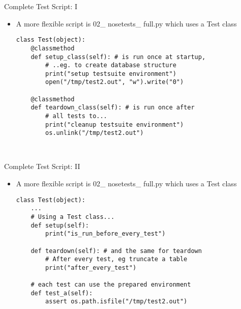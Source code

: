 \begin{frame}[fragile]{Complete Test Script: I}
\begin{itemize}
\item A more flexible script is 02\_ nosetests\_ full.py 
which uses a Test class
\begin{verbatim}
class Test(object):
    @classmethod
    def setup_class(self): # is run once at startup, 
        # ..eg. to create database structure
        print("setup testsuite environment")
        open("/tmp/test2.out", "w").write("0")

    @classmethod
    def teardown_class(self): # is run once after 
        # all tests to...
        print("cleanup testsuite environment")
        os.unlink("/tmp/test2.out")

 
\end{verbatim} 
\end{itemize}
\end{frame}

\begin{frame}[fragile]{Complete Test Script: II}
\begin{itemize}
\item A more flexible script is 02\_ nosetests\_ full.py 
which uses a Test class
\begin{verbatim}
class Test(object):
    ...
    # Using a Test class...
    def setup(self): 
        print("is_run_before_every_test")

    def teardown(self): # and the same for teardown
        # After every test, eg truncate a table
        print("after_every_test")

    # each test can use the prepared environment
    def test_a(self): 
        assert os.path.isfile("/tmp/test2.out")
 
\end{verbatim}
\end{itemize}
\end{frame}

